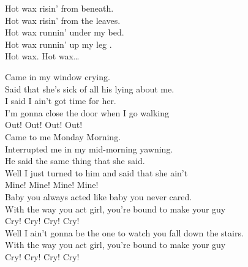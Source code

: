 Hot wax risin' from beneath. \\
Hot wax risin' from the leaves. \\
Hot wax runnin' under my bed. \\
Hot wax runnin' up my leg . \\

Hot wax. Hot wax… \\





Came in my window crying. \\
Said that she's sick of all his lying about me. \\
I said I ain't got time for her. \\
I'm gonna close the door when I go walking \\
Out! Out! Out! Out! \\

Came to me Monday Morning. \\
Interrupted me in my mid-morning yawning. \\
He said the same thing that she said. \\
Well I just turned to him and said that she ain't \\
Mine! Mine! Mine! Mine! \\

Baby you always acted like baby you never cared. \\
With the way you act girl, you're bound to make your guy \\
Cry! Cry! Cry! Cry! \\

Well I ain't gonna be the one to watch you fall down the stairs. \\
With the way you act girl, you're bound to make your guy \\
Cry! Cry! Cry! Cry! \\






